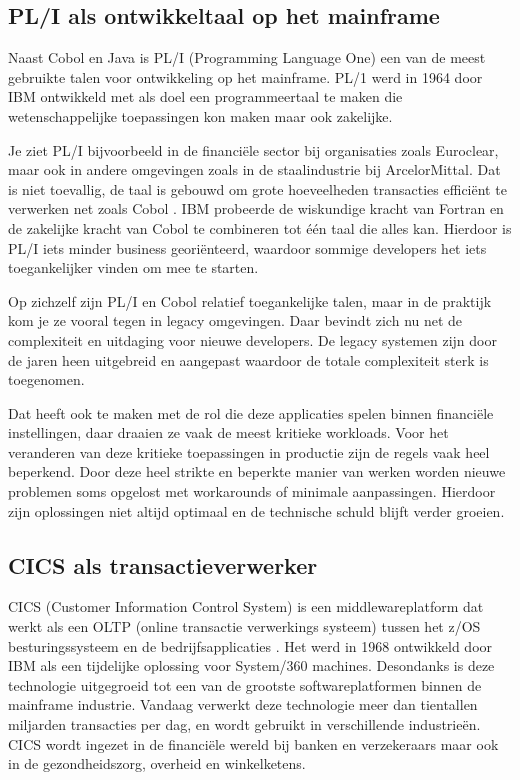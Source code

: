 \subsection{PL/I als ontwikkeltaal op het mainframe}%
\label{sec:pli-taal}

Naast Cobol en Java is PL/I (Programming Language One) een van de meest gebruikte talen voor ontwikkeling op het mainframe. 
PL/1 werd in 1964 door IBM ontwikkeld met als doel een programmeertaal te maken die wetenschappelijke toepassingen kon maken maar ook zakelijke.


Je ziet PL/I bijvoorbeeld in de financiële sector bij organisaties zoals Euroclear, maar ook in andere omgevingen zoals in de staalindustrie bij ArcelorMittal. 
Dat is niet toevallig, de taal is gebouwd om grote hoeveelheden transacties efficiënt te verwerken net zoals Cobol \autocite{dau2024xmainframe}. 
IBM probeerde de wiskundige kracht van Fortran en de zakelijke kracht van Cobol te combineren tot één taal die alles kan.
Hierdoor is PL/I iets minder business georiënteerd, waardoor sommige developers het iets toegankelijker vinden om mee te starten.

Op zichzelf zijn PL/I en Cobol relatief toegankelijke talen, maar in de praktijk kom je ze vooral tegen in legacy omgevingen. 
Daar bevindt zich nu net de complexiteit en uitdaging voor nieuwe developers.
De legacy systemen zijn door de jaren heen uitgebreid en aangepast waardoor de totale complexiteit sterk is toegenomen.

Dat heeft ook te maken met de rol die deze applicaties spelen binnen financiële instellingen,
 daar draaien ze vaak de meest kritieke workloads. 
Voor het veranderen van deze kritieke toepassingen in productie zijn de regels vaak heel beperkend.
Door deze heel strikte en beperkte manier van werken worden nieuwe problemen soms opgelost met workarounds of minimale aanpassingen.
Hierdoor zijn oplossingen niet altijd optimaal en de technische schuld blijft verder groeien.

\subsection{CICS als transactieverwerker}%
\label{sec:cics-transactie}

CICS (Customer Information Control System) is een middlewareplatform dat werkt als een OLTP (online transactie verwerkings systeem) tussen het z/OS besturingssysteem en de bedrijfsapplicaties \autocite{horswill2000cics}.
Het werd in 1968 ontwikkeld door IBM als een tijdelijke oplossing voor System/360 machines.
Desondanks is deze technologie uitgegroeid tot een van de grootste softwareplatformen binnen de mainframe industrie.
Vandaag verwerkt deze technologie meer dan tientallen miljarden transacties per dag, en wordt gebruikt in verschillende industrieën.
CICS wordt ingezet in de financiële wereld bij banken en verzekeraars maar ook in de gezondheidszorg, overheid en winkelketens.

